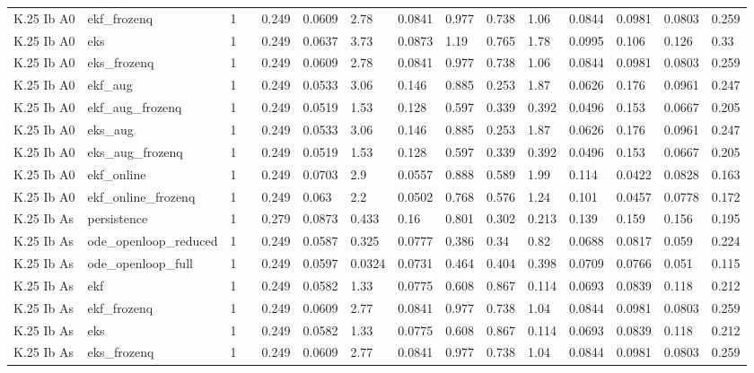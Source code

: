 \begin{table}[t]
\begin{tabular}{lllllllllllllll}
K.25 Ib A0 & ekf\_frozenq & 1 &  & 0.249 & 0.0609 & 2.78 & 0.0841 & 0.977 & 0.738 & 1.06 & 0.0844 & 0.0981 & 0.0803 & 0.259 \\
K.25 Ib A0 & eks & 1 &  & 0.249 & 0.0637 & 3.73 & 0.0873 & 1.19 & 0.765 & 1.78 & 0.0995 & 0.106 & 0.126 & 0.33 \\
K.25 Ib A0 & eks\_frozenq & 1 &  & 0.249 & 0.0609 & 2.78 & 0.0841 & 0.977 & 0.738 & 1.06 & 0.0844 & 0.0981 & 0.0803 & 0.259 \\
K.25 Ib A0 & ekf\_aug & 1 &  & 0.249 & 0.0533 & 3.06 & 0.146 & 0.885 & 0.253 & 1.87 & 0.0626 & 0.176 & 0.0961 & 0.247 \\
K.25 Ib A0 & ekf\_aug\_frozenq & 1 &  & 0.249 & 0.0519 & 1.53 & 0.128 & 0.597 & 0.339 & 0.392 & 0.0496 & 0.153 & 0.0667 & 0.205 \\
K.25 Ib A0 & eks\_aug & 1 &  & 0.249 & 0.0533 & 3.06 & 0.146 & 0.885 & 0.253 & 1.87 & 0.0626 & 0.176 & 0.0961 & 0.247 \\
K.25 Ib A0 & eks\_aug\_frozenq & 1 &  & 0.249 & 0.0519 & 1.53 & 0.128 & 0.597 & 0.339 & 0.392 & 0.0496 & 0.153 & 0.0667 & 0.205 \\
K.25 Ib A0 & ekf\_online & 1 &  & 0.249 & 0.0703 & 2.9 & 0.0557 & 0.888 & 0.589 & 1.99 & 0.114 & 0.0422 & 0.0828 & 0.163 \\
K.25 Ib A0 & ekf\_online\_frozenq & 1 &  & 0.249 & 0.063 & 2.2 & 0.0502 & 0.768 & 0.576 & 1.24 & 0.101 & 0.0457 & 0.0778 & 0.172 \\
K.25 Ib As & persistence & 1 &  & 0.279 & 0.0873 & 0.433 & 0.16 & 0.801 & 0.302 & 0.213 & 0.139 & 0.159 & 0.156 & 0.195 \\
K.25 Ib As & ode\_openloop\_reduced & 1 &  & 0.249 & 0.0587 & 0.325 & 0.0777 & 0.386 & 0.34 & 0.82 & 0.0688 & 0.0817 & 0.059 & 0.224 \\
K.25 Ib As & ode\_openloop\_full & 1 &  & 0.249 & 0.0597 & 0.0324 & 0.0731 & 0.464 & 0.404 & 0.398 & 0.0709 & 0.0766 & 0.051 & 0.115 \\
K.25 Ib As & ekf & 1 &  & 0.249 & 0.0582 & 1.33 & 0.0775 & 0.608 & 0.867 & 0.114 & 0.0693 & 0.0839 & 0.118 & 0.212 \\
K.25 Ib As & ekf\_frozenq & 1 &  & 0.249 & 0.0609 & 2.77 & 0.0841 & 0.977 & 0.738 & 1.04 & 0.0844 & 0.0981 & 0.0803 & 0.259 \\
K.25 Ib As & eks & 1 &  & 0.249 & 0.0582 & 1.33 & 0.0775 & 0.608 & 0.867 & 0.114 & 0.0693 & 0.0839 & 0.118 & 0.212 \\
K.25 Ib As & eks\_frozenq & 1 &  & 0.249 & 0.0609 & 2.77 & 0.0841 & 0.977 & 0.738 & 1.04 & 0.0844 & 0.0981 & 0.0803 & 0.259 \\

\end{tabular}
\end{table}
